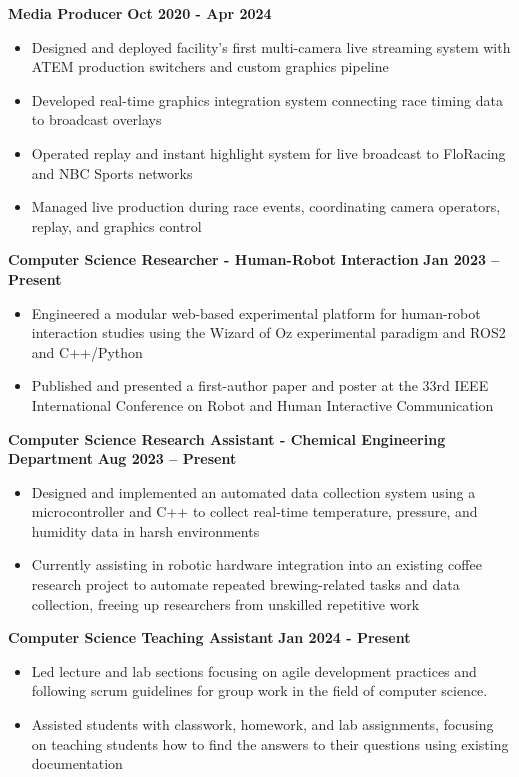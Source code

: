 \documentclass{article}
\begin{document}
\textbf{Media Producer} \hfill \textbf{Oct 2020 - Apr 2024}
\begin{itemize}[noitemsep,topsep=2pt]
	\item Designed and deployed facility's first multi-camera live streaming system with ATEM production switchers and custom graphics pipeline
	\item Developed real-time graphics integration system connecting race timing data to broadcast overlays
	\item Operated replay and instant highlight system for live broadcast to FloRacing and NBC Sports networks
	\item Managed live production during race events, coordinating camera operators, replay, and graphics control
\end{itemize}

 \hfill {}

\textbf{Computer Science Researcher - Human-Robot Interaction} \hfill \textbf{Jan 2023 – Present}
\begin{itemize}[noitemsep,topsep=2pt]
    \item Engineered a modular web-based experimental platform for human-robot interaction studies using the Wizard of Oz experimental paradigm and ROS2 and C++/Python
    \item Published and presented a first-author paper and poster at the 33rd IEEE International Conference on Robot and Human Interactive Communication
\end{itemize}

\textbf{Computer Science Research Assistant - Chemical Engineering Department} \hfill \textbf{Aug 2023 – Present}
\begin{itemize}[noitemsep,topsep=2pt]
    \item Designed and implemented an automated data collection system using a microcontroller and C++ to collect real-time temperature, pressure, and humidity data in harsh environments
    \item Currently assisting in robotic hardware integration into an existing coffee research project to automate repeated brewing-related tasks and data collection, freeing up researchers from unskilled repetitive work
\end{itemize}

\textbf{Computer Science Teaching Assistant} \hfill \textbf{Jan 2024 - Present}
\begin{itemize}[noitemsep,topsep=2pt]
	\item Led lecture and lab sections focusing on agile development practices and following scrum guidelines for group work in the field of computer science.
	\item Assisted students with classwork, homework, and lab assignments, focusing on teaching students how to find the answers to their questions using existing documentation
\end{itemize}
\end{document}
